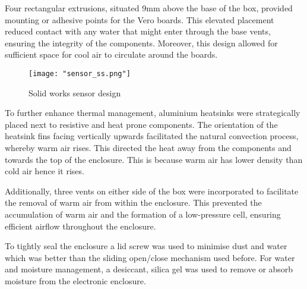 \documentclass[class=report,11pt,crop=false]{standalone}
\begin{document}
Four rectangular extrusions, situated 9mm above the base of the box, provided mounting or adhesive points for the Vero boards. This elevated placement reduced contact with any water that might enter through the base vents, ensuring the integrity of the components. Moreover, this design allowed for sufficient space for cool air to circulate around the boards.
\newline
\newline
\begin{figure}[H]
    \centering
    \texttt{[image: "sensor\_ss.png"]}
    \caption{Solid works sensor design}
    \label{fig:enter-label3}
\end{figure}

To further enhance thermal management, aluminium heatsinks were strategically placed next to resistive and heat prone components. The orientation of the heatsink fins facing vertically upwards facilitated the natural convection process, whereby warm air rises. This directed the heat away from the components and towards the top of the enclosure. This is because warm air has lower density than cold air hence it rises. 
\newline

Additionally, three vents on either side of the box were incorporated to facilitate the removal of warm air from within the enclosure. This prevented the accumulation of warm air and the formation of a low-pressure cell, ensuring efficient airflow throughout the enclosure.
\newline

To tightly seal the enclosure a lid screw was used to minimise dust and water which was better than the sliding open/close mechanism used before.
\newline
For water and moisture management, a desiccant, silica gel was used to remove or absorb moisture from the electronic enclosure.
\newline
\end{document}
